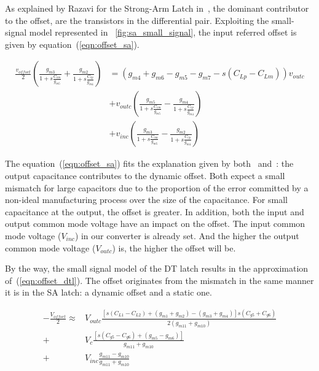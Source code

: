 As explained by Razavi for the Strong-Arm Latch in~\cite{Razavi2015}, the dominant contributor to the offset, are the transistors in the differential pair. Exploiting the small-signal model represented in \figurename~\ref{fig:sa_small_signal}, the input referred offset is given by equation~(\ref{eqn:offset_sa}).

\begin{align}
    \label{eqn:offset_sa}
    \frac{v_{offset}}{2} \left( \frac{g_{m3}}{1+s\frac{C_{cm}}{g_{m5}}} + \frac{g_{m2}}{1+s\frac{C_{cp}}{g_{m4}}} \right) &= \left( g_{m4}+g_{m6}-g_{m5}-g_{m7}-s\left(C_{Lp}-C_{Lm}\right) \right) v_{outc} \\
    &+ v_{outc} \left( \frac{g_{m5}}{1+s\frac{C_{cm}}{g_{m5}}} - \frac{g_{m4}}{1+s\frac{C_{cp}}{g_{m4}}} \right) \nonumber \\
    &+ v_{inc} \left( \frac{g_{m3}}{1+s\frac{C_{cm}}{g_{m5}}} - \frac{g_{m2}}{1+s\frac{C_{cp}}{g_{m4}}} \right) \nonumber
\end{align}

The equation~(\ref{eqn:offset_sa}) fits the explanation given by both~\cite{Razavi2015} and~\cite{Abidi2014}: the output capacitance contributes to the dynamic offset. Both expect a small mismatch for large capacitors due to the proportion of the error committed by a non-ideal manufacturing process over the size of the capacitance. For small capacitance at the output, the offset is greater. In addition, both the input and output common mode voltage have an impact on the offset. The input common mode voltage (\(V_{inc}\)) in our converter is already set. And the higher the output common mode voltage (\(V_{outc}\)) is, the higher the offset will be.

By the way, the small signal model of the DT latch results in the approximation of~(\ref{eqn:offset_dtl}). The offset originates from the mismatch in the same manner it is in the SA latch: a dynamic offset and a static one.

\begin{align}
\label{eqn:offset_dtl}
-\frac{V_{offset}}{2} \approx & V_{outc}\frac{\left[s \left(C_{L1} - C_{L2}\right) + \left(g_{m1}+g_{m2}\right) -\left(g_{m3}+g_{m4}\right)\right] s \left(C_{g5} + C_{g6}\right)}{2(g_{m11}+g_{m10})}\\
+ & V_c \frac{\left[s \left(C_{g5}-C_{g6}\right) + \left(g_{m5}-g_{m6}\right)\right]}{g_{m11}+g_{m10}}  \nonumber  \\
+ & V_{inc}\frac{g_{m11}-g_{m10}}{g_{m11}+g_{m10}} \nonumber 
\end{align}

